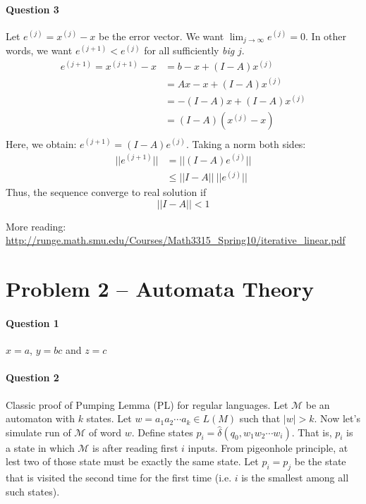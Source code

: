 \paragraph{Question 3}
Let $e^{(j)} = x^{(j)} - x$ be the error vector. 
We want $\lim_{j\to \infty} e^{(j)} = 0$.
In other words, we want $e^{(j+1)} < e^{(j)}$ for all sufficiently \textit{big} $j$.
\begin{align*}
e^{(j+1)} = x^{(j+1)} - x &=  b - x  + (I -A) x^{(j)}  \\
                &= Ax - x  + (I -A) x^{(j)}  \\
                &= -(I-A)x  + (I -A) x^{(j)}  \\
                &= (I -A)(x^{(j)} - x) \\
\end{align*}
Here, we obtain: $e^{(j+1)} = (I -A) e^{(j)}$. 
Taking a norm both sides:
\begin{align*}
    ||e^{(j+1)}|| &= ||(I -A) e^{(j)}|| \\
              &\leq ||I -A|| \: || e^{(j)}||
\end{align*}
Thus, the sequence converge to real solution if 
\begin{equation*}
    ||I -A|| < 1
\end{equation*}

More reading:
\url{http://runge.math.smu.edu/Courses/Math3315_Spring10/iterative_linear.pdf}


\section{Problem 2 – Automata Theory}

\paragraph{Question 1}
$x = a$, $y = bc$ and $z = c$

\paragraph{Question 2}
Classic proof of Pumping Lemma (PL) for regular languages.
Let $\mathcal{M}$ be an automaton with $k$ states.
Let $w = a_1a_2\cdots a_k \in L(M)$ such that $|w| > k$.
Now let's simulate run of $\mathcal{M}$ of word $w$.
Define states $p_i = \hat\delta(q_0, w_1w_2\cdots w_i)$.
That is, $p_i$ is a state in which $\mathcal{M}$ is after reading first $i$ inputs.
From pigeonhole principle, at lest two of those state must be exactly the same state.
Let $p_i = p_j$ be the state that is visited the second time for the first time (i.e. $i$ is the smallest among all such states).

